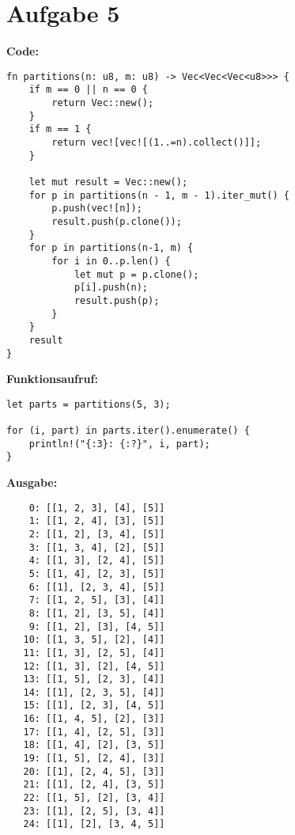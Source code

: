 \documentclass[a4paper]{scrartcl}
\begin{document}
\section*{Aufgabe 5}

\textbf{Code:}
\begin{lstlisting}
fn partitions(n: u8, m: u8) -> Vec<Vec<Vec<u8>>> {
    if m == 0 || n == 0 {
        return Vec::new();
    }
    if m == 1 {
        return vec![vec![(1..=n).collect()]];
    }

    let mut result = Vec::new();
    for p in partitions(n - 1, m - 1).iter_mut() {
        p.push(vec![n]);
        result.push(p.clone());
    }
    for p in partitions(n-1, m) {
        for i in 0..p.len() {
            let mut p = p.clone();
            p[i].push(n);
            result.push(p);
        }
    }
    result
}
\end{lstlisting}

\textbf{Funktionsaufruf:}
\begin{lstlisting}
let parts = partitions(5, 3);

for (i, part) in parts.iter().enumerate() {
    println!("{:3}: {:?}", i, part);    
}
\end{lstlisting}

\textbf{Ausgabe:}
\begin{lstlisting}
    0: [[1, 2, 3], [4], [5]]
    1: [[1, 2, 4], [3], [5]]
    2: [[1, 2], [3, 4], [5]]
    3: [[1, 3, 4], [2], [5]]
    4: [[1, 3], [2, 4], [5]]
    5: [[1, 4], [2, 3], [5]]
    6: [[1], [2, 3, 4], [5]]
    7: [[1, 2, 5], [3], [4]]
    8: [[1, 2], [3, 5], [4]]
    9: [[1, 2], [3], [4, 5]]
   10: [[1, 3, 5], [2], [4]]
   11: [[1, 3], [2, 5], [4]]
   12: [[1, 3], [2], [4, 5]]
   13: [[1, 5], [2, 3], [4]]
   14: [[1], [2, 3, 5], [4]]
   15: [[1], [2, 3], [4, 5]]
   16: [[1, 4, 5], [2], [3]]
   17: [[1, 4], [2, 5], [3]]
   18: [[1, 4], [2], [3, 5]]
   19: [[1, 5], [2, 4], [3]]
   20: [[1], [2, 4, 5], [3]]
   21: [[1], [2, 4], [3, 5]]
   22: [[1, 5], [2], [3, 4]]
   23: [[1], [2, 5], [3, 4]]
   24: [[1], [2], [3, 4, 5]]
\end{lstlisting}
\end{document}
